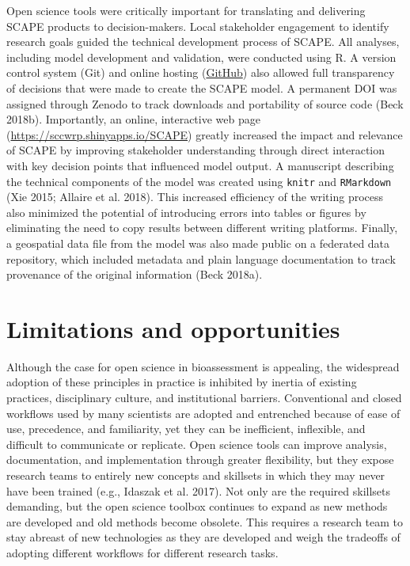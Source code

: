 \documentclass[fleqn,10pt,lineno]{wlpeerj} %
\begin{document}
Open science tools were critically important for translating and delivering SCAPE products to decision-makers. Local stakeholder engagement to identify research goals guided the technical development process of SCAPE. All analyses, including model development and validation, were conducted using R. A version control system (Git) and online hosting (\href{https://github.com/SCCWRP/SCAPE}{GitHub}) also allowed full transparency of decisions that were made to create the SCAPE model. A permanent DOI was assigned through Zenodo to track downloads and portability of source code (Beck 2018b). Importantly, an online, interactive web page (\url{https://sccwrp.shinyapps.io/SCAPE}) greatly increased the impact and relevance of SCAPE by improving stakeholder understanding through direct interaction with key decision points that influenced model output. A manuscript describing the technical components of the model was created using \texttt{knitr} and \texttt{RMarkdown} (Xie 2015; Allaire et al. 2018). This increased efficiency of the writing process also minimized the potential of introducing errors into tables or figures by eliminating the need to copy results between different writing platforms. Finally, a geospatial data file from the model was also made public on a federated data repository, which included metadata and plain language documentation to track provenance of the original information (Beck 2018a).

\hypertarget{limitations-and-opportunities}{%
\section{Limitations and opportunities}\label{limitations-and-opportunities}}

Although the case for open science in bioassessment is appealing, the widespread adoption of these principles in practice is inhibited by inertia of existing practices, disciplinary culture, and institutional barriers. Conventional and closed workflows used by many scientists are adopted and entrenched because of ease of use, precedence, and familiarity, yet they can be inefficient, inflexible, and difficult to communicate or replicate. Open science tools can improve analysis, documentation, and implementation through greater flexibility, but they expose research teams to entirely new concepts and skillsets in which they may never have been trained (e.g., Idaszak et al. 2017). Not only are the required skillsets demanding, but the open science toolbox continues to expand as new methods are developed and old methods become obsolete. This requires a research team to stay abreast of new technologies as they are developed and weigh the tradeoffs of adopting different workflows for different research tasks.
\end{document}
